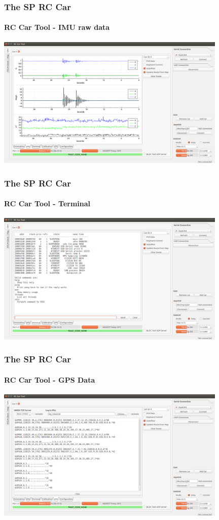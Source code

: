 \documentclass[aspectratio=169,electronics,notopline]{beamer}
\begin{document}
\begin{frame} 
\frametitle{The SP RC Car}
\framesubtitle{RC Car Tool - IMU raw data}
\begin{center}
	\includegraphics[width=11cm]{Figures/GUI/car_imu.png}
\end{center}
\end{frame}

\begin{frame} 
\frametitle{The SP RC Car}
\framesubtitle{RC Car Tool - Terminal}
\begin{center}
	\includegraphics[width=11cm]{Figures/GUI/car_terminal.png}
\end{center}
\end{frame}

\begin{frame} 
\frametitle{The SP RC Car}
\framesubtitle{RC Car Tool - GPS Data}
\begin{center}
	\includegraphics[width=11cm]{Figures/GUI/car_gps.png}
\end{center}
\end{frame}
\end{document}
